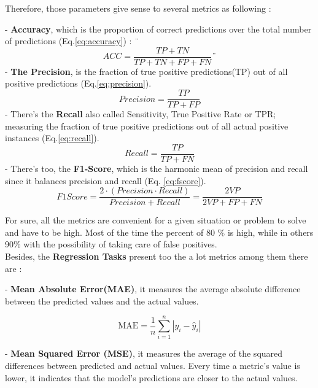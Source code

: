 \documentclass[12pt,a4paper, oneside]{book}
\begin{document}
Therefore, those parameters give sense to several metrics as following : 

- \textbf{Accuracy}, which is the proportion of correct predictions over the total number of predictions (Eq.\ref{eq:accuracy}) : 
¨
\begin{equation} 
\label{eq:accuracy}
	ACC = \frac{TP+TN}{TP+TN+FP+FN} 
¨\end{equation} 
- \textbf{The Precision}, is the fraction of true positive predictions(TP) out of all positive predictions (Eq.\ref{eq:precision}). 
\begin{equation}
	\label{eq:precision} 
	Precision = \frac{TP}{TP+FP}
\end{equation}  
- There's the \textbf{Recall} also called Sensitivity, True Positive Rate or TPR; measuring the fraction of true positive predictions out of all actual positive instances (Eq.\ref{eq:recall}). 
\begin{equation}
	\label{eq:recall}  
	Recall = \frac{TP}{TP+FN}
\end{equation} 
- There's too, the \textbf{F1-Score}, which is the harmonic mean of precision and recall since it balances precision and recall (Eq. \ref{eq:fscore}). 
\begin{equation}
\label{eq:fscore}
F1Score = \frac{2 \cdot (Precision \cdot Recall)}{Precision + Recall} = \frac{2VP}{2VP + FP + FN}
\end{equation}

For sure, all the metrics are convenient for a given situation or problem to solve and have to be high. Most of the time the percent of 80 \% is high, while in others 90\% with the possibility of taking care of false positives.  \\

Besides, the \textbf{Regression Tasks} present too the a lot metrics among them there are \citep{coursAnalyseDonne3} : 

- \textbf{Mean Absolute Error(MAE)}, it measures the average absolute difference between the predicted values and the actual values. 

\begin{equation}
	\text{MAE} = \frac{1}{n} \sum_{i=1}^{n} |y_i - \hat{y}_i|
\end{equation}

- \textbf{Mean Squared Error (MSE)}, it measures the average of the squared differences between predicted and actual values.
 Every time a metric's value is lower, it indicates that the model's predictions are closer to the actual values. 
\end{document}
